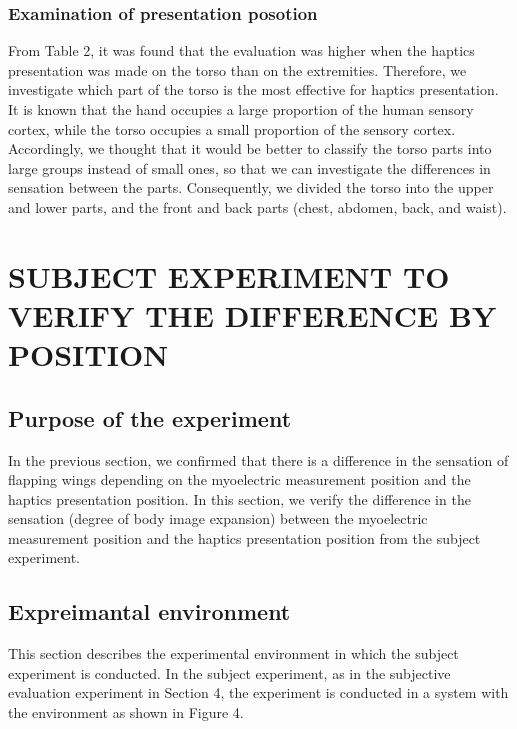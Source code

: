 \documentclass[letterpaper, 10 pt, conference]{ieeeconf}  %
\begin{document}
                \subsubsection{Examination of presentation posotion}
                        From Table 2, it was found that the evaluation was higher when the haptics presentation was made on the torso than on the extremities. 
                        Therefore, we investigate which part of the torso is the most effective for haptics presentation. 
                        It is known that the hand occupies a large proportion of the human sensory cortex, while the torso occupies a small proportion of the sensory cortex\cite{penfield1950cerebral}. 
                        Accordingly, we thought that it would be better to classify the torso parts into large groups instead of small ones, so that we can investigate the differences in sensation between the parts. 
                        Consequently, we divided the torso into the upper and lower parts, and the front and back parts (chest, abdomen, back, and waist).        


\section{SUBJECT EXPERIMENT TO VERIFY THE DIFFERENCE BY POSITION}

        \subsection{Purpose of the experiment}
                In the previous section, we confirmed that there is a difference in the sensation of flapping wings depending on the myoelectric measurement position and the haptics presentation position.  
                In this section, we verify the difference in the sensation (degree of body image expansion) between the myoelectric measurement position and the haptics presentation position from the subject experiment.  

        \subsection{Expreimantal environment}
                This section describes the experimental environment in which the subject experiment is conducted.  
                In the subject experiment, as in the subjective evaluation experiment in Section 4, the experiment is conducted in a system with the environment as shown in Figure 4.  
\end{document}
